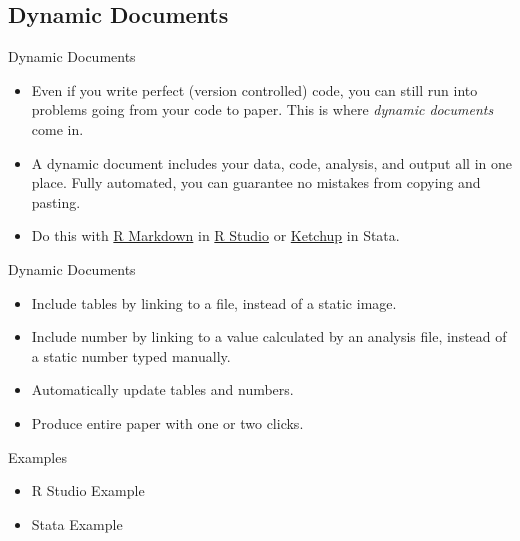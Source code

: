 \documentclass{beamer}
\begin{document}
\subsection{Dynamic Documents}
\begin{frame}{Dynamic Documents}
\begin{itemize}[<+->]
\item
Even if you write perfect (version controlled) code, you can still run into problems going from your code to paper. This is where \textit{dynamic documents} come in.
\item
A dynamic document includes your data, code, analysis, and output all in one place. Fully automated, you can guarantee no mistakes from copying and pasting.
\item
Do this with \href{http://rmarkdown.rstudio.com/}{R Markdown} in \href{https://www.rstudio.com/}{R Studio} or 
\href{http://haghish.com/statistics/stata-blog/reproducible-research/ketchup.php}{Ketchup} in Stata.
\end{itemize}
\end{frame}


\begin{frame}{Dynamic Documents}
\begin{itemize}
\item Include tables by linking to a file, instead of a static image.
\item Include number by linking to a value calculated by an analysis file, instead of a static number typed manually.
\item Automatically update tables and numbers.
\item Produce entire paper with one or two clicks.
\end{itemize} 
\end{frame}


\begin{frame}{Examples}
\begin{itemize}
\item
R Studio Example
\item
Stata Example
\end{itemize}
\end{frame}
\end{document}
